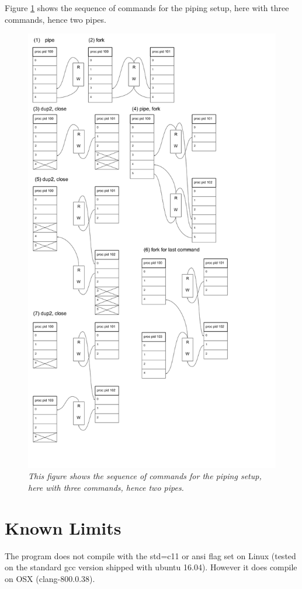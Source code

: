 \documentclass[a4paper,11pt,twoside]{article}
\begin{document}
Figure \ref{fig:pipes} shows the sequence of commands for the piping
setup, here with three commands, hence two pipes.
\begin{figure}
\centering
\includegraphics[width=\textwidth]{pipes.png}
\caption{\textit{This figure shows the sequence of commands for the
    piping setup, here with three commands, hence two pipes.}}
\label{fig:pipes}
\end{figure}




\section{Known Limits}
The program does not compile with the std=c11 or ansi flag set on Linux (tested on the standard gcc version shipped with ubuntu 16.04). However it does compile on OSX (clang-800.0.38).  
\end{document}
